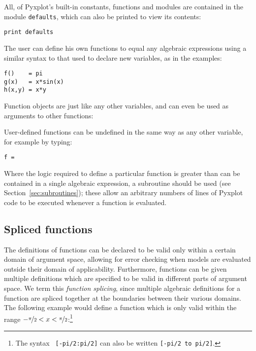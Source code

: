 \vspace{3mm}

\vspace{3mm}

\noindent All, of Pyxplot's built-in constants, functions and modules are
contained in the module {\tt defaults}, which can also be printed to view its
contents:

\begin{verbatim}
print defaults
\end{verbatim}

The user can define his own functions to equal any algebraic expressions using
a similar syntax to that used to declare new variables, as in the examples:

\begin{verbatim}
f()    = pi
g(x)   = x*sin(x)
h(x,y) = x*y
\end{verbatim}

\noindent Function objects are just like any other variables, and can even be
used as arguments to other functions:

\vspace{3mm}

\vspace{3mm}

User-defined functions can be undefined in the same way as any other variable,
for example by typing:

\begin{verbatim}
f =
\end{verbatim}

Where the logic required to define a particular function is greater than can be
contained in a single algebraic expression, a subroutine should be used (see
Section~\ref{sec:subroutines}); these allow an arbitrary numbers of lines of
Pyxplot code to be executed whenever a function is evaluated.

\subsection{Spliced functions}  

The definitions of functions can be declared to be valid only within a certain
domain of argument space, allowing for error checking when models are evaluated
outside their domain of applicability. Furthermore, functions can be given
multiple definitions which are specified to be valid in different parts of
argument space. We term this {\it function splicing}, since multiple algebraic
definitions for a function are spliced together at the boundaries between
their various domains.  The following example would define a function which is
only valid within the range
$-\nicefrac{\pi}{2}<x<\nicefrac{\pi}{2}$:\footnote{The syntax {\tt
[-pi/2:pi/2]} can also be written {\tt [-pi/2 to pi/2]}.}

